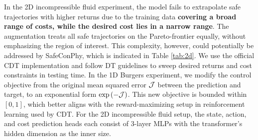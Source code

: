 In the 2D incompressible fluid experiment, the model fails to extrapolate safe trajectories with higher returns due to the training data \textbf{covering a broad range of costs, while the desired cost lies in a narrow range}. The augmentation treats all safe trajectories on the Pareto-frontier equally, without emphasizing the region of interest. 
This complexity, however, could potentially be addressed by SafeConPhy, which is indicated in Table \ref{tab:2d}. We use the official CDT implementation and follow DT guidelines to sweep desired returns and cost constraints in testing time. In the 1D Burgers experiment, we modify the control objective from the original mean squared error $\mathcal{J}$ between the prediction and target, to an exponential form $\exp\left( -\mathcal{J} \right)$. This new objective is bounded within $[0,1]$, which better aligns with the reward-maximizing setup in reinforcement learning used by CDT. For the 2D incompressible fluid setup, the state, action, and cost prediction heads each consist of 3-layer MLPs with the transformer's hidden dimension as the inner size.

